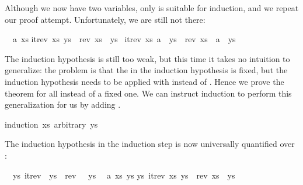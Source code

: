 \begin{isabellebody}
\begin{isamarkuptxt}
Although we now have two variables, only  is suitable for
induction, and we repeat our proof attempt. Unfortunately, we are still
not there:
\begin{isabelle}%
\ {}{}\ {}a\ xs{}\isanewline
{}itrev\ xs\ ys\ {}\ rev\ xs\ {}\ ys\ {}\isanewline
{}itrev\ xs\ {}a\ {}\ ys{}\ {}\ rev\ xs\ {}\ a\ {}\ ys%
\end{isabelle}
The induction hypothesis is still too weak, but this time it takes no
intuition to generalize: the problem is that the 
in the induction hypothesis is fixed,
but the induction hypothesis needs to be applied with
 instead of . Hence we prove the theorem
for all  instead of a fixed one. We can instruct induction
to perform this generalization for us by adding .%
\end{isamarkuptxt}%
\isamarkuptrue%
%
\endisatagproof
{\isafoldproof}%
%
\isadelimproof
%
\endisadelimproof
%
\isadelimproof
%
\endisadelimproof
%
\isatagproof
{}\isamarkupfalse%
{}induction\ xs\ arbitrary{}\ ys{}%
\begin{isamarkuptxt}%
The induction hypothesis in the induction step is now universally quantified over :
\begin{isabelle}%
\ {}{}\ {}ys{}\ itrev\ {}{}\ ys\ {}\ rev\ {}{}\ {}\ ys\isanewline
\ {}{}\ {}a\ xs\ ys{}\isanewline
{}ys{}\ itrev\ xs\ ys\ {}\ rev\ xs\ {}\ ys{}\ {}\isanewline

\end{isabelle}
\end{isamarkuptxt}
\end{isabellebody}
